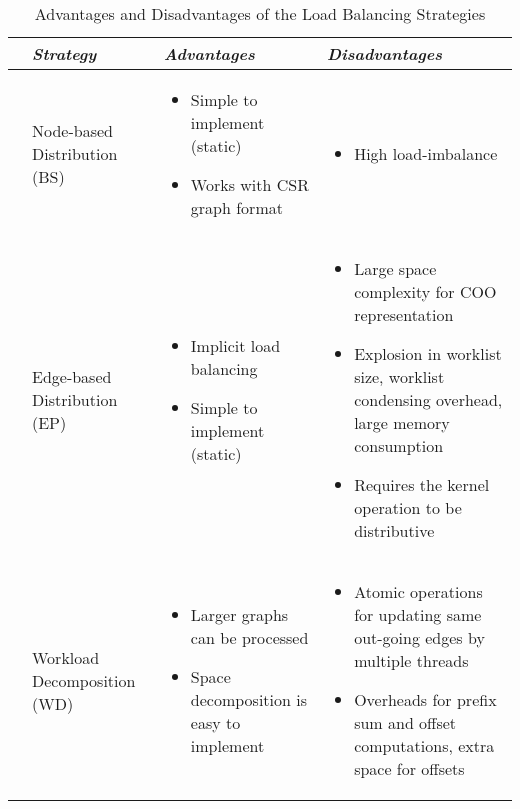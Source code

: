 \begin{table*}
 \centering
 \footnotesize
 \caption{Advantages and Disadvantages of the Load Balancing Strategies}
 \begin{tabular}{|c|p{1.45in}|p{2.45in}|p{2.55in}|}
  \hline\hline
  & {\em Strategy} & {\em Advantages} & {\em Disadvantages} \\
  \hline\hline
  \parbox[t]{2mm}{} &
  Node-based Distribution (BS) &
   \parbox{2.5in} {
	\begin{itemize}
	\item Simple to implement (static)
	\item  Works with CSR graph format
   	\end{itemize} 
   } &
   \parbox{2.5in} {
   	\begin{itemize}
	\item High load-imbalance
   	\end{itemize} 
   } \\
   &
  Edge-based Distribution (EP) & 
   \parbox{2.5in} {
   	\begin{itemize}
	\item Implicit load balancing 
	\item Simple to implement (static)
   	\end{itemize} 
   } &
  \parbox{2.5in}{
  \begin{itemize}
   \item Large space complexity for COO representation
   \item Explosion in worklist size, worklist condensing overhead, large memory consumption
   \item Requires the kernel operation to be distributive
  \end{itemize}
  } \\ \hline
  \parbox[t]{2mm}{} &
  Workload Decomposition (WD) & 
  \parbox{2.5in}{
  \begin{itemize}
   \item Larger graphs can be processed
   \item Space decomposition is easy to implement
  \end{itemize}
  } & 
  \parbox{2.5in}{
  \begin{itemize}
   \item Atomic operations for updating same out-going edges by multiple threads
   \item Overheads for prefix sum and offset computations, extra space for offsets

\end{itemize}}
\end{tabular}
\end{table*}
